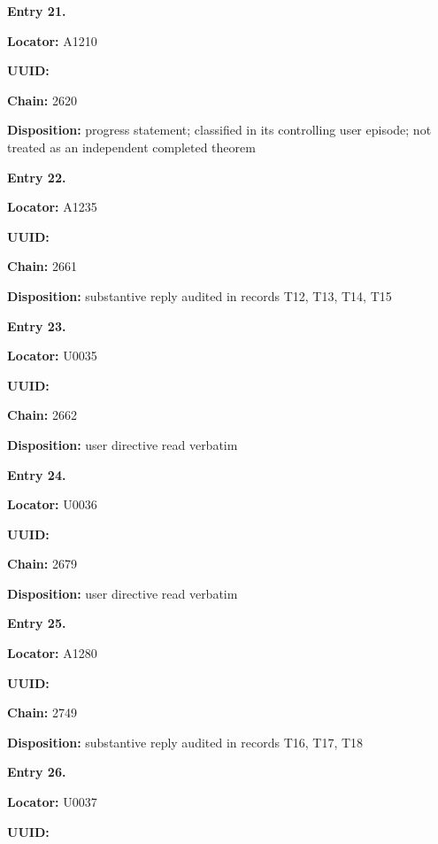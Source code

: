 \textbf{Entry 21.}

\textbf{Locator:} A1210

\textbf{UUID:} \protect{}

\textbf{Chain:} 2620

\textbf{Disposition:} progress statement; classified in its controlling
user episode; not treated as an independent completed theorem


\textbf{Entry 22.}

\textbf{Locator:} A1235

\textbf{UUID:} \protect{}

\textbf{Chain:} 2661

\textbf{Disposition:} substantive reply audited in records T12, T13,
T14, T15


\textbf{Entry 23.}

\textbf{Locator:} U0035

\textbf{UUID:} \protect{}

\textbf{Chain:} 2662

\textbf{Disposition:} user directive read verbatim


\textbf{Entry 24.}

\textbf{Locator:} U0036

\textbf{UUID:} \protect{}

\textbf{Chain:} 2679

\textbf{Disposition:} user directive read verbatim


\textbf{Entry 25.}

\textbf{Locator:} A1280

\textbf{UUID:} \protect{}

\textbf{Chain:} 2749

\textbf{Disposition:} substantive reply audited in records T16, T17, T18


\textbf{Entry 26.}

\textbf{Locator:} U0037

\textbf{UUID:} \protect{}

